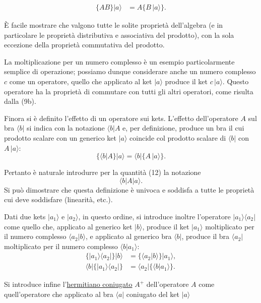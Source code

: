 \documentclass[11pt, a4paper]{book}
\numberwithin{equation}{section}
\begin{document}

\begin{align}
\bigl\{AB\bigr\}|a\rangle &= A\bigl\{B\,|a\rangle\bigr\}. \tag{11}
\end{align}

È facile mostrare che valgono tutte le solite proprietà dell'algebra (e
in particolare le proprietà distributiva e associativa del prodotto), con
la sola eccezione della proprietà commutativa del prodotto.

La moltiplicazione per un numero complesso è un esempio particolarmente
semplice di operazione; possiamo dunque considerare anche un numero
complesso $c$ come un operatore, quello che applicato al ket $|a\rangle$
produce il ket $c\,|a\rangle$. Questo operatore ha la proprietà di
commutare con tutti gli altri operatori, come risulta dalla (9b).

Finora si è definito l'effetto di un operatore sui kets. L'effetto
dell'operatore $A$ sul bra $\langle b|$ si indica con la notazione
$\langle b|A$ e, per definizione, produce un bra il cui prodotto scalare
con un generico ket $|a\rangle$ coincide col prodotto scalare di
$\langle b|$ con $A\,|a\rangle$:
\begin{equation}
\bigl\{\langle b|A\bigr\}|a\rangle = \langle b|\bigl\{A\,|a\rangle\bigr\}.
\end{equation}

Pertanto è naturale introdurre per la quantità (12) la notazione
\[
\langle b|A|a\rangle.
\]
Si può dimostrare che questa definizione è univoca e soddisfa a tutte le
proprietà cui deve soddisfare (linearità, etc.).

Dati due kets $|a_1\rangle$ e $|a_2\rangle$, in questo ordine, si
introduce inoltre l'operatore $|a_1\rangle\langle a_2|$ come quello che,
applicato al generico ket $|b\rangle$, produce il ket $|a_1\rangle$
moltiplicato per il numero complesso $\langle a_2|b\rangle$, e applicato
al generico bra $\langle b|$, produce il bra $\langle a_2|$ moltiplicato
per il numero complesso $\langle b|a_1\rangle$:
\begin{align}
\bigl\{|a_1\rangle\langle a_2|\bigr\}|b\rangle
  &= \bigl\{\langle a_2|b\rangle\bigr\}|a_1\rangle, \tag{13a} \\
\langle b|\bigl\{|a_1\rangle\langle a_2|\bigr\}
  &= \langle a_2|\bigl\{\langle b|a_1\rangle\bigr\}. \tag{13b}
\end{align}

Si introduce infine l'\uline{hermitiano coniugato} $A^+$ dell'operatore
$A$ come quell'operatore che applicato al bra $\langle a|$ coniugato del
ket $|a\rangle$
\end{document}
